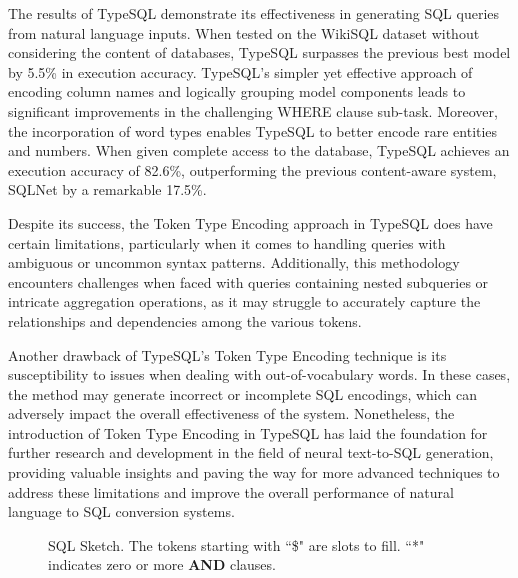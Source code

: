 The results of TypeSQL demonstrate its effectiveness in generating SQL queries from natural language inputs. When tested on the WikiSQL dataset without considering the content of databases, TypeSQL surpasses the previous best model by 5.5\% in execution accuracy. TypeSQL's simpler yet effective approach of encoding column names and logically grouping model components leads to significant improvements in the challenging WHERE clause sub-task. Moreover, the incorporation of word types enables TypeSQL to better encode rare entities and numbers. When given complete access to the database, TypeSQL achieves an execution accuracy of 82.6\%, outperforming the previous content-aware system, SQLNet by a remarkable 17.5\%.

Despite its success, the Token Type Encoding approach in TypeSQL does have certain limitations, particularly when it comes to handling queries with ambiguous or uncommon syntax patterns. Additionally, this methodology encounters challenges when faced with queries containing nested subqueries or intricate aggregation operations, as it may struggle to accurately capture the relationships and dependencies among the various tokens.

Another drawback of TypeSQL's Token Type Encoding technique is its susceptibility to issues when dealing with out-of-vocabulary words. In these cases, the method may generate incorrect or incomplete SQL encodings, which can adversely impact the overall effectiveness of the system. Nonetheless, the introduction of Token Type Encoding in TypeSQL has laid the foundation for further research and development in the field of neural text-to-SQL generation, providing valuable insights and paving the way for more advanced techniques to address these limitations and improve the overall performance of natural language to SQL conversion systems.

\begin{figure}[H]
    \centering
    \caption{\centering SQL Sketch. The tokens starting with ``\$" are slots to fill. ``*" indicates zero or more \textbf{AND} clauses.\cite{DBLP:journals/corr/abs-1804-09769}}
    \label{fig:sql_sketch}
\end{figure}